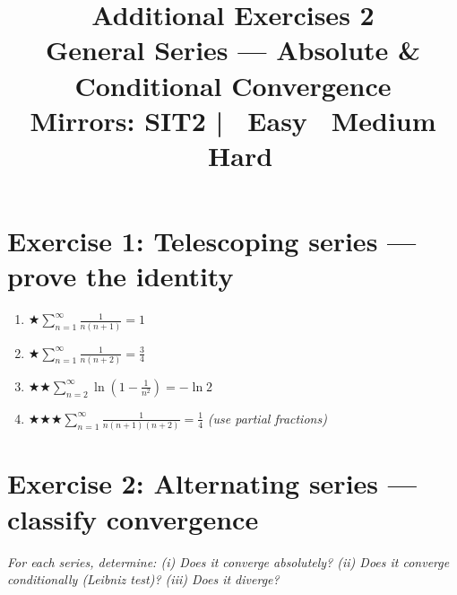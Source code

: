 \documentclass[12pt,a4paper]{article}
\title{\textbf{Additional Exercises 2}\\
\large General Series --- Absolute \& Conditional Convergence\\[4pt]
\normalsize Mirrors: SIT2 \quad|\quad
\easy\ Easy \quad \medium\ Medium \quad \hard\ Hard}
\date{}
\newcommand{\easy}{{\color{green!60!black}$\bigstar$}}
\newcommand{\medium}{{\color{orange}$\bigstar\bigstar$}}
\newcommand{\hard}{{\color{red}$\bigstar\bigstar\bigstar$}}
\begin{document}
\maketitle
\thispagestyle{empty}

\section*{Exercise 1: Telescoping series --- prove the identity}

\begin{enumerate}[leftmargin=*, label=(\alph*)]

\item \easy\quad $\displaystyle\sum_{n=1}^{\infty}\frac{1}{n(n+1)} = 1$

\item \easy\quad $\displaystyle\sum_{n=1}^{\infty}\frac{1}{n(n+2)} = \frac{3}{4}$

\item \medium\quad $\displaystyle\sum_{n=2}^{\infty}\ln\!\left(1-\frac{1}{n^2}\right) = -\ln 2$

\item \hard\quad $\displaystyle\sum_{n=1}^{\infty}\frac{1}{n(n+1)(n+2)} = \frac{1}{4}$
\quad\emph{(use partial fractions)}

\end{enumerate}

\section*{Exercise 2: Alternating series --- classify convergence}

\emph{For each series, determine: (i) Does it converge absolutely?
(ii) Does it converge conditionally (Leibniz test)?
(iii) Does it diverge?}
\end{document}
